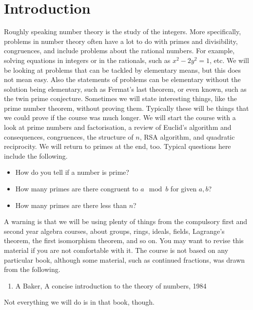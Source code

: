 \def\module{M3P14 Number Theory}
\def\lecturer{Prof Toby Gee}
\def\term{Autumn 2018}








\section{Introduction}

Roughly speaking number theory is the study of the integers. More specifically, problems in number theory often have a lot to do with primes and divisibility, congruences, and include problems about the rational numbers. For example, solving equations in integers or in the rationals, such as $ x^2 - 2y^2 = 1 $, etc. We will be looking at problems that can be tackled by elementary means, but this does not mean easy. Also the statements of problems can be elementary without the solution being elementary, such as Fermat's last theorem, or even known, such as the twin prime conjecture. Sometimes we will state interesting things, like the prime number theorem, without proving them. Typically these will be things that we could prove if the course was much longer. We will start the course with a look at prime numbers and factorisation, a review of Euclid's algorithm and consequences, congruences, the structure of $ \unit{n} $, RSA algorithm, and quadratic reciprocity. We will return to primes at the end, too. Typical questions here include the following.
\begin{itemize}
\item How do you tell if a number is prime?
\item How many primes are there congruent to $ a \mod b $ for given $ a, b $?
\item How many primes are there less than $ n $?
\end{itemize}
A warning is that we will be using plenty of things from the compulsory first and second year algebra courses, about groups, rings, ideals, fields, Lagrange's theorem, the first isomorphism theorem, and so on. You may want to revise this material if you are not comfortable with it. The course is not based on any particular book, although some material, such as continued fractions, was drawn from the following.
\begin{enumerate}
\item A Baker, A concise introduction to the theory of numbers, 1984
\end{enumerate}
Not everything we will do is in that book, though.

